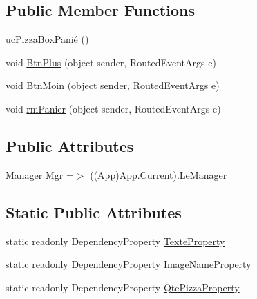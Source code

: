\subsection*{Public Member Functions}
\begin{DoxyCompactItemize}
\item 
\hyperlink{classnewPizza1_1_1ucPizzaBoxPani_xC3_xA9_a56d476316603c46b5fbb8e6fbb358341}{uc\+Pizza\+Box\+Panié} ()
\item 
void \hyperlink{classnewPizza1_1_1ucPizzaBoxPani_xC3_xA9_a6c68f66117ab0bfb69dd27f8e3972b34}{Btn\+Plus} (object sender, Routed\+Event\+Args e)
\item 
void \hyperlink{classnewPizza1_1_1ucPizzaBoxPani_xC3_xA9_a5f8f130d8d24722e0fde22297193e9e0}{Btn\+Moin} (object sender, Routed\+Event\+Args e)
\item 
void \hyperlink{classnewPizza1_1_1ucPizzaBoxPani_xC3_xA9_a54708dc95183cabe08a0182b79305aeb}{rm\+Panier} (object sender, Routed\+Event\+Args e)
\end{DoxyCompactItemize}
\subsection*{Public Attributes}
\begin{DoxyCompactItemize}
\item 
\hyperlink{classModele_1_1Manager}{Manager} \hyperlink{classnewPizza1_1_1ucPizzaBoxPani_xC3_xA9_a8bf5e4ad9d5295a1d0b9ea6274f7d13f}{Mgr} =$>$ ((\hyperlink{classnewPizza1_1_1App}{App})App.\+Current).Le\+Manager
\end{DoxyCompactItemize}
\subsection*{Static Public Attributes}
\begin{DoxyCompactItemize}
\item 
static readonly Dependency\+Property \hyperlink{classnewPizza1_1_1ucPizzaBoxPani_xC3_xA9_a7141d5cd942ddb5318f6ab0d76bf97ce}{Texte\+Property}
\item 
static readonly Dependency\+Property \hyperlink{classnewPizza1_1_1ucPizzaBoxPani_xC3_xA9_a0949e266403e3b467d0febb440515438}{Image\+Name\+Property}
\item 
static readonly Dependency\+Property \hyperlink{classnewPizza1_1_1ucPizzaBoxPani_xC3_xA9_a796de413f86211769bb19e20a5c5ed44}{Qte\+Pizza\+Property}
\end{DoxyCompactItemize}
